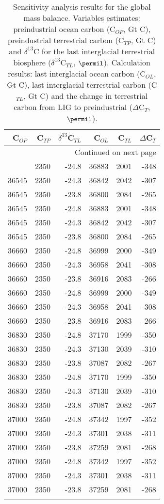 \begin{longtable}{rrrrrr}

  C$_{OP}$ &  C$_{TP}$ &  $\delta^{13}$C$_{TL}$ &   C$_{OL}$ &  C$_{TL}$ &  $\Delta$C$_{T}$ \\

\endhead

\multicolumn{6}{r}{{Continued on next page}} \\

\endfoot


\endlastfoot
 36545 &  2350 &    -24.8 &  36883 &  2001 &  -348 \\
 36545 &  2350 &    -24.3 &  36842 &  2042 &  -307 \\
 36545 &  2350 &    -23.8 &  36800 &  2084 &  -265 \\
 36545 &  2350 &    -24.8 &  36883 &  2001 &  -348 \\
 36545 &  2350 &    -24.3 &  36842 &  2042 &  -307 \\
 36545 &  2350 &    -23.8 &  36800 &  2084 &  -265 \\
 36660 &  2350 &    -24.8 &  36999 &  2000 &  -349 \\
 36660 &  2350 &    -24.3 &  36958 &  2041 &  -308 \\
 36660 &  2350 &    -23.8 &  36916 &  2083 &  -266 \\
 36660 &  2350 &    -24.8 &  36999 &  2000 &  -349 \\
 36660 &  2350 &    -24.3 &  36958 &  2041 &  -308 \\
 36660 &  2350 &    -23.8 &  36916 &  2083 &  -266 \\
 36830 &  2350 &    -24.8 &  37170 &  1999 &  -350 \\
 36830 &  2350 &    -24.3 &  37130 &  2039 &  -310 \\
 36830 &  2350 &    -23.8 &  37087 &  2082 &  -267 \\
 36830 &  2350 &    -24.8 &  37170 &  1999 &  -350 \\
 36830 &  2350 &    -24.3 &  37130 &  2039 &  -310 \\
 36830 &  2350 &    -23.8 &  37087 &  2082 &  -267 \\
 37000 &  2350 &    -24.8 &  37342 &  1997 &  -352 \\
 37000 &  2350 &    -24.3 &  37301 &  2038 &  -311 \\
 37000 &  2350 &    -23.8 &  37259 &  2081 &  -268 \\
 37000 &  2350 &    -24.8 &  37342 &  1997 &  -352 \\
 37000 &  2350 &    -24.3 &  37301 &  2038 &  -311 \\
 37000 &  2350 &    -23.8 &  37259 &  2081 &  -268 \\
\caption{Sensitivity analysis results for the global mass balance. Variables estimates: preindustrial ocean carbon (C$_{OP}$, Gt C), preindustrial terrestrial carbon (C$_{TP}$, Gt C) and $\delta^{13}$C for the last interglacial terrestrial biosphere ($\delta^{13}$C$_{TL}$, $\permil$). Calculation results: last interglacial ocean carbon (C$_{OL}$, Gt C), last interglacial terrestrial carbon (C$_{TL}$, Gt C) and the change in terrestrial carbon from LIG to preindustrial ($\Delta$C$_T$, $\permil$).} \label{mass_balance_tb}\end{longtable}
